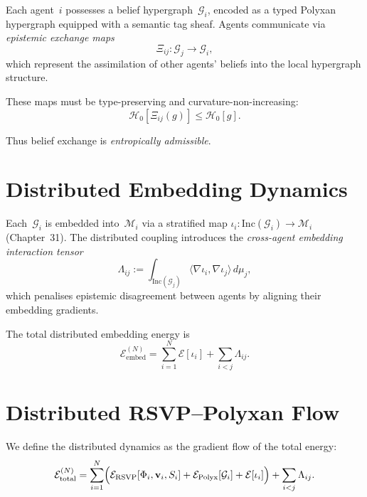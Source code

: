 Each agent~$i$ possesses a belief hypergraph~$\mathcal{G}_i$, encoded as a
typed Polyxan hypergraph equipped with a semantic tag sheaf.
Agents communicate via \emph{epistemic exchange maps}
\begin{equation}
\Xi_{ij} : \mathcal{G}_j \longrightarrow \mathcal{G}_i,
\end{equation}
which represent the assimilation of other agents' beliefs into the local
hypergraph structure.

These maps must be type-preserving and curvature-non-increasing:
\begin{equation}
\mathcal{H}_0[\Xi_{ij}(g)] \le \mathcal{H}_0[g].
\end{equation}

Thus belief exchange is \emph{entropically admissible}.

\section{Distributed Embedding Dynamics}

Each~$\mathcal{G}_i$ is embedded into~$\mathcal{M}_i$ via a stratified map
$\iota_i : \mathrm{Inc}(\mathcal{G}_i)\to\mathcal{M}_i$ (Chapter~31).
The distributed coupling introduces the \emph{cross-agent embedding
interaction tensor}
\begin{equation}
\Lambda_{ij}
  := \int_{\mathrm{Inc}(\mathcal{G}_j)}
      \bigl\langle \nabla \iota_i, \nabla \iota_j \bigr\rangle\, d\mu_j,
\end{equation}
which penalises epistemic disagreement between agents by aligning their
embedding gradients.

The total distributed embedding energy is
\begin{equation}
\mathcal{E}_{\mathrm{embed}}^{(N)}
  = \sum_{i=1}^N \mathcal{E}[\iota_i]
  + \sum_{i < j} \Lambda_{ij}.
\end{equation}

\section{Distributed RSVP–Polyxan Flow}

We define the distributed dynamics as the gradient flow of the total energy:
\begin{equation}
\mathcal{E}_{\mathrm{total}}^{(N)}
  = \sum_{i=1}^N \Bigl(
      \mathcal{E}_{\mathrm{RSVP}}[\Phi_i, \mathbf{v}_i, S_i]
    + \mathcal{E}_{\mathrm{Polyx}}[\mathcal{G}_i]
    + \mathcal{E}[\iota_i]
    \Bigr)
    + \sum_{i<j} \Lambda_{ij}.
\end{equation}

